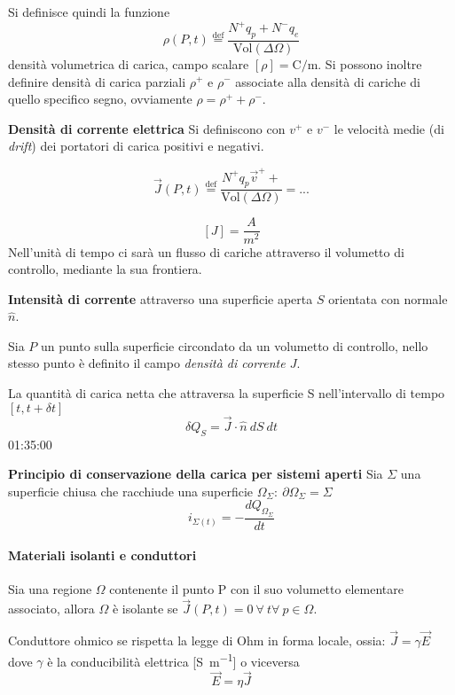 Si definisce quindi la funzione 
$$
\rho(P,t) \stackrel{\text{def}}{=} \frac{N^+q_p+N^-q_e}{\text{Vol}(\Delta\Omega)}
$$
densità volumetrica di carica, campo scalare $[\rho] = \si{\coulomb\per\meter}$.
Si possono inoltre definire densità di carica parziali $\rho^+$ e $\rho^-$ associate alla densità
di cariche di quello specifico segno, ovviamente $\rho = \rho^+ + \rho^-$.

\textbf{Densità di corrente elettrica}
Si definiscono con $v^+$ e $v^-$ le velocità medie (di \textit{drift}) dei portatori di carica positivi e negativi.

$$
\vec{J}(P,t) \stackrel{\text{def}}{=} \frac{N^+q_p\vec{v}^+ + }{\text{Vol}(\Delta \Omega)} = ...
$$

$$
[J] = \frac{A}{m^2}
$$
Nell'unità di tempo ci sarà un flusso di cariche attraverso il volumetto di controllo, mediante la sua 
frontiera.

\textbf{Intensità di corrente} attraverso una superficie aperta $S$ orientata con normale $\hat{n}$.

Sia $P$ un punto sulla superficie circondato da un volumetto di controllo, nello stesso punto
è definito il campo \textit{densità di corrente $J$}.

La quantità di carica netta che attraversa la superficie S nell'intervallo di tempo $[t,t+\delta t]$
$$
\delta Q_S = \vec{J}\cdot \hat{n}\ dS\ dt
$$
01:35:00



\textbf{Principio di conservazione della carica per sistemi aperti}
Sia $\Sigma$ una superficie chiusa che racchiude una superficie
$\Omega_\Sigma:\ \partial\Omega_\Sigma=\Sigma$
$$
i_{\Sigma(t)} = - \frac{dQ_{\Omega_\Sigma}}{dt}
$$

\paragraph{Materiali isolanti e conduttori}
Sia una regione $\Omega$ contenente il punto P con il suo volumetto elementare associato, allora
$\Omega$ è isolante se $\vec{J}(P,t) = 0\ \forall\ t \forall\ p \in \Omega$.

Conduttore ohmico se rispetta la legge di Ohm in forma locale, ossia:
$\vec{J} = \gamma\vec{E}$ dove $\gamma$ è la conducibilità elettrica [\si{\siemens\per\meter}]
o viceversa
$$
\vec{E} = \eta \vec{J}
$$

